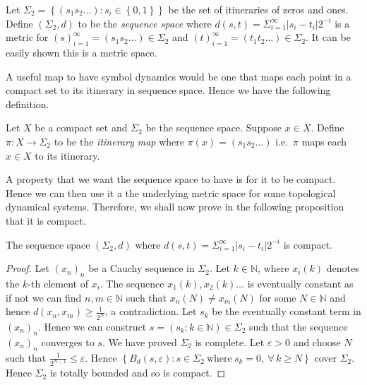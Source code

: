 \begin{defn} \label{defn:sequence-space}
    Let $\Sigma_2 = \left\lbrace (s_1s_2\dots): s_i \in \left\lbrace 0, 1 \right\rbrace \right\rbrace$ be the set of itineraries of zeros and ones. Define $(\Sigma_2, d)$ to be the \emph{sequence space} where $d(s, t) = \Sigma_{i=1}^{\infty}|s_i - t_i|2^{-i}$ is a metric for $(s)_{i=1}^{\infty} = (s_1s_2\dots) \in \Sigma_2$ and $(t)_{i=1}^{\infty} = (t_1t_2\dots) \in \Sigma_2$. It can be easily shown this is a metric space.
\end{defn}

A useful map to have symbol dynamics would be one that maps each point in a compact set to its itinerary in sequence space. Hence we have the following definition.

\begin{defn} \label{defn:itinerary-map}
    Let $X$ be a compact set and $\Sigma_2$ be the sequence space. Suppose $x \in X$. Define $\pi : X \to \Sigma_2$ to be the \emph{itinerary map} where $\pi(x) = (s_1s_2\dots)$ i.e.\ $\pi$ maps each $x \in X$ to its itinerary.
\end{defn}

A property that we want the sequence space to have is for it to be compact. Hence we can then use it a the underlying metric space for some topological dynamical systems. Therefore, we shall now prove in the following proposition that it is compact.

\begin{prop}
    The sequence space $(\Sigma_2, d)$ where $d(s, t) = \Sigma_{i=1}^{\infty}|s_i - t_i|2^{-i}$ is compact.
    \begin{proof}
        Let $(x_n)_n$ be a Cauchy sequence in $\Sigma_2$. Let $k \in \mathbb{N}$, where $x_i(k)$ denotes the $k$-th element of $x_i$. The sequence $x_1(k),x_2(k)\dots$ is eventually constant as if not we can find $n, m \in \mathbb{N}$ such that $x_n(N) \neq x_m(N)$ for some $N \in \mathbb{N}$ and hence $d(x_n, x_m) \geq \frac{1}{2^N}$, a contradiction. Let $s_k$ be the eventually constant term in $(x_n)_n$. Hence we can construct $s = ( s_k : k \in \mathbb{N} ) \in \Sigma_2$ such that the sequence $(x_n)_n$ converges to $s$. We have proved $\Sigma_2$ is complete. Let $\varepsilon > 0$ and choose $N$ such that $\frac{1}{2^{N - 1}} \leq \varepsilon$. Hence $\left\lbrace B_d(s, \varepsilon) : s \in \Sigma_2 \ \text{where} \ s_k = 0, \ \forall\, k \geq N\right\rbrace$ cover $\Sigma_2$. Hence $\Sigma_2$ is totally bounded and so is compact.
    \end{proof}
\end{prop}

